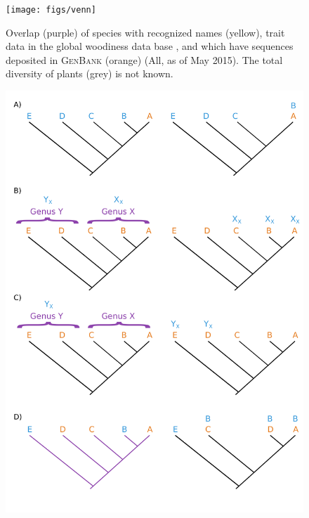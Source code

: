 \documentclass[a4paper,11pt]{article}
\begin{document}
\clearpage




\begin{figure}[p]
\texttt{[image: figs/venn]}
\caption{Overlap (purple) of species with recognized names (yellow), trait data in the global woodiness data base \citep[blue][]{Zanne, FitzJohn2014}, and which have sequences deposited in \textsc{GenBank} (orange) (All, as of May 2015). The total diversity of plants (grey) is not known.}
\label{fig:venn}
\end{figure}

\begin{figure}[p]
\includegraphics[scale=0.7]{figs/algo-description}
\caption{}
\label{fig:algo}
\end{figure}
\end{document}
